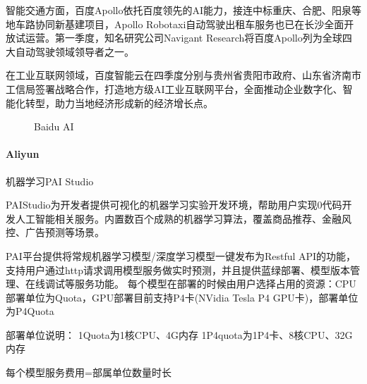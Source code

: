 \documentclass[letterpaper,11pt,english]{sphinxmanual}
\begin{document}
智能交通方面，百度Apollo依托百度领先的AI能力，接连中标重庆、合肥、阳泉等地车路协同新基建项目，Apollo
Robotaxi自动驾驶出租车服务也已在长沙全面开放试运营。第一季度，知名研究公司Navigant
Research将百度Apollo列为全球四大自动驾驶领域领导者之一。%
\begin{footnote}[232]\sphinxAtStartFootnote
{}
%
\end{footnote}

在工业互联网领域，百度智能云在四季度分别与贵州省贵阳市政府、山东省济南市工信局签署战略合作，打造地方级AI工业互联网平台，全面推动企业数字化、智能化转型，助力当地经济形成新的经济增长点。%
\begin{footnote}[233]\sphinxAtStartFootnote
{}
%
\end{footnote}

\begin{figure}[H]
\centering
\capstart

\noindent{}
\caption{Baidu AI}\label{\detokenize{chapter_project/AI_company:id7}}\end{figure}


\paragraph{Aliyun}
\label{\detokenize{chapter_project/AI_company:aliyun}}
机器学习PAI
Studio%
\begin{footnote}[234]\sphinxAtStartFootnote
{}
%
\end{footnote}
PAI\sphinxhyphen{}Studio为开发者提供可视化的机器学习实验开发环境，帮助用户实现0代码开发人工智能相关服务。内置数百个成熟的机器学习算法，覆盖商品推荐、金融风控、广告预测等场景。

PAI平台提供将常规机器学习模型/深度学习模型一键发布为Restful
API的功能，支持用户通过http请求调用模型服务做实时预测，并且提供蓝绿部署、模型版本管理、在线调试等服务功能。
每个模型在部署的时候由用户选择占用的资源：CPU部署单位为Quota，GPU部署目前支持P4卡(NVidia
Tesla P4 GPU卡)，部署单位为P4Quota

部署单位说明： 1Quota为1核CPU、4G内存 1P4quota为1P4卡、8核CPU、32G内存

每个模型服务费用=部属单位数量时长
\end{document}
